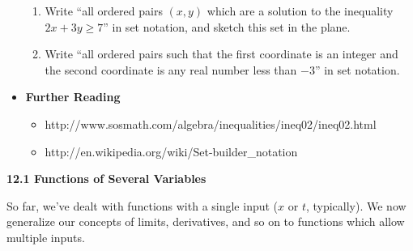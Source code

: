 \documentclass[12pt]{article}
\theoremstyle{plain}
\theoremstyle{definition}
\theoremstyle{remark}
\begin{document}
\begin{itemize}
\begin{enumerate}
			\item Write ``all ordered pairs $(x,y)$ which are a solution to the inequality $2x+3y\geq 7$'' in set notation, and sketch this set in the plane.
			\item Write ``all ordered pairs such that the first coordinate is an integer and the second coordinate is any real number less than $-3$'' in set notation.
			\end{enumerate}
		\item \textbf{Further Reading}
			\begin{itemize}
			\item http://www.sosmath.com/algebra/inequalities/ineq02/ineq02.html
			\item http://en.wikipedia.org/wiki/Set-builder\_notation
			\end{itemize}
		\end{itemize}
	
	
	\newpage
	
	\centerline{\bf 12.1 Functions of Several Variables}
	
	So far, we've dealt with functions with a single input ($x$ or $t$, typically). We now generalize our concepts of limits, derivatives, and so on to functions which allow multiple inputs.
	
\end{document}
